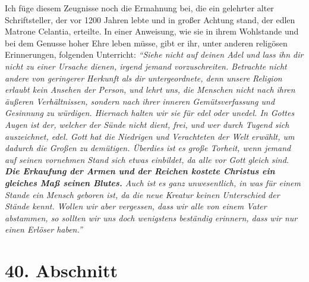 Ich füge diesem Zeugnisse noch die Ermahnung bei, die ein gelehrter alter
Schriftsteller, der vor 1200 Jahren lebte und in großer Achtung stand, der
edlen Matrone Celantia, erteilte. In einer
Anweisung,
wie sie in ihrem
Wohlstande und bei dem Genusse hoher Ehre leben müsse, gibt er ihr, unter
anderen religösen Erinnerungen, folgenden Unterricht:
\textit{"`Siehe nicht auf deinen
Adel und lass ihn dir nicht zu einer Ursache dienen, irgend jemand
vorzuschreiten. Betrachte nicht andere von geringerer Herkunft als dir
untergeordnete, denn unsere Religion erlaubt kein Ansehen der Person, und
lehrt uns, die Menschen nicht nach ihren äußeren Verhältnissen, sondern nach
ihrer inneren Gemütsverfassung und Gesinnung zu würdigen. Hiernach halten wir
sie für edel oder unedel. In Gottes Augen ist der, welcher der Sünde nicht
dient, frei, und wer durch Tugend sich auszeichnet, edel. Gott hat die
Niedrigen und Verachteten der Welt erwählt, um dadurch die Großen zu demütigen.
Überdies ist es große Torheit, wenn jemand auf seinen vornehmen Stand sich
etwas einbildet, da alle vor Gott gleich sind. \label{ref:09_39_erettung}
\textbf{Die Erkaufung der Armen und der
Reichen kostete Christus ein gleiches Maß seinen Blutes.} Auch ist es ganz
unwesentlich, in was für einem Stande ein Mensch geboren ist, da die neue
Kreatur keinen Unterschied der Stände kennt. Wollen wir aber vergessen, dass wir
alle von einem Vater abstammen, so sollten wir uns doch wenigstens beständig
erinnern, dass wir nur einen Erlöser haben."'}

\section{40. Abschnitt} \label{kap9_ab40}

